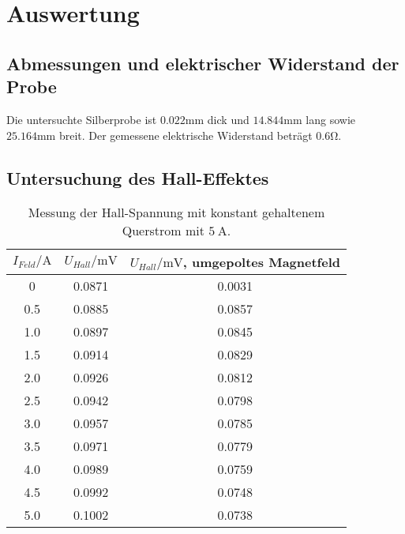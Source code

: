 \section{Auswertung}
  \subsection{Abmessungen und elektrischer Widerstand der Probe}
    Die untersuchte Silberprobe ist $0.022 \si{\milli\meter}$ dick und $14.844 \si{\milli\meter}$ lang sowie
    $25.164\si{\milli\meter}$ breit. Der gemessene elektrische Widerstand beträgt $0.6 \si{\ohm}$.
  \subsection{Untersuchung des Hall-Effektes}
    \begin{table}
      \centering
        \caption{Messung der Hall-Spannung mit konstant gehaltenem Querstrom mit $\SI{5}{\ampere}$.}
        \label{tab:hallspannung1}
        \begin{tabular}{S S S }
          \toprule
          {$I_{Feld} /\si{\ampere}$} & {$U_{Hall} /\si{\milli\volt}$} & {$U_{Hall} / \si{\milli\volt}$, umgepoltes Magnetfeld} \\
             & 0.0871 & 0.0031 \\
          0.5 & 0.0885 & 0.0857 \\
          1.0 & 0.0897 & 0.0845 \\
          1.5 & 0.0914 & 0.0829 \\
          2.0 & 0.0926 & 0.0812 \\
          2.5 & 0.0942 & 0.0798 \\
          3.0 & 0.0957 & 0.0785 \\
          3.5 & 0.0971 & 0.0779 \\
          4.0 & 0.0989 & 0.0759 \\
          4.5 & 0.0992 & 0.0748 \\
          5.0 & 0.1002 & 0.0738 \\
          \bottomrule
        \end{tabular}
      \end{table}
